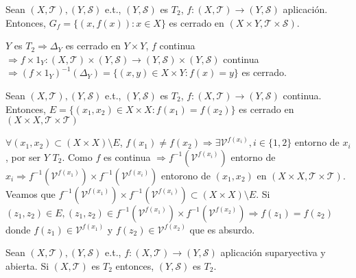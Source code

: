 \begin{cor}
  Sean $( X, \mathcal{T} ), ( Y, \mathcal{S} )$ e.t., $( Y, \mathcal{S} )$ es $T_{2}$, $f: ( X, \mathcal{T} ) \to ( Y, \mathcal{S} )$ aplicación. Entonces, $G_{f} = \{  (x, f(x)) : x \in X \}$ es cerrado en $(X \times Y, \mathcal{T} \times \mathcal{S})$.
\end{cor}

\begin{dem}
  $Y$ es $T_{2} \Rightarrow \Delta_{Y}$ es cerrado en $Y \times Y$, $f$ continua $\Rightarrow f \times 1_{Y}: ( X, \mathcal{T} ) \times ( Y, \mathcal{S} ) \to ( Y, \mathcal{S} ) \times ( Y, \mathcal{S} )$ continua $\Rightarrow (f \times 1_{Y})^{-1}(\Delta_{Y}) = \{ (x, y) \in X \times Y : f(x) = y \}$ es cerrado. 
\end{dem}

\begin{prop}
  Sean $( X, \mathcal{T} ), ( Y, \mathcal{S} )$ e.t., $( Y, \mathcal{S} )$ es $T_{2}$, $f: ( X, \mathcal{T} ) \to ( Y, \mathcal{S} )$ continua. Entonces, $ E =\{ (x_{1}, x_{2}) \in X \times X : f(x_{1}) = f(x_{2})\}$ es cerrado en $ ( X \times X, \mathcal{T} \times \mathcal{T})$
\end{prop}

\begin{dem}
  $\forall (x_{1}, x_{2}) \subset (X \times X) \setminus E$, $f(x_{1}) \neq f(x_{2}) \Rightarrow \exists \mathcal{V}^{f(x_{i})}, i \in \{ 1,2 \}$ entorno de $x_{i}$, por ser $Y$ $T_{2}$. Como $f$ es continua $\Rightarrow f^{-1}(\mathcal{V}^{f(x_{i})})$ entorno de $x_{i} \Rightarrow f^{-1}(\mathcal{V}^{f(x_{1})}) \times f^{-1}(\mathcal{V}^{f(x_{i})})$ entorono de $(x_{1}, x_{2})$ en $( X \times X, \mathcal{T} \times \mathcal{T})$. Veamos que $f^{-1}(\mathcal{V}^{f(x_{1})}) \times f^{-1}(\mathcal{V}^{f(x_{i})}) \subset (X \times X) \setminus E$. Si $(z_{1}, z_{2}) \in E, (z_{1}, z_{2}) \in f^{-1}(\mathcal{V}^{f(x_{1})}) \times f^{-1}(\mathcal{V}^{f(x_{2})}) \Rightarrow f(z_{1})= f(z_{2})$ donde $f(z_{1}) \in \mathcal{V}^{f(x_{1})}$ y $ f(z_{2}) \in \mathcal{V}^{f(x_{2})}$ que es absurdo.
\end{dem}

\begin{prop}
  Sean $ ( X, \mathcal{T} ), ( Y, \mathcal{S} )$ e.t., $f: ( X, \mathcal{T} ) \to ( Y, \mathcal{S} )$ aplicación suparyectiva y abierta. Si $( X, \mathcal{T} )$ es $T_{2}$ entonces, $( Y, \mathcal{S} )$ es $ T_{2}$.
\end{prop}

